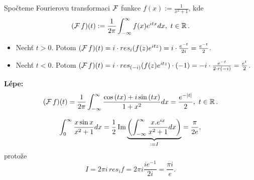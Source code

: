 \begin{example}
Spočteme Fourierovu transformaci $\operatorname{\mathcal{F}} $ funkce $f(x):=\frac{1}{x^2+1}$, kde
$$(\F f)(t):=\frac{1}{2\pi}\int_{-\infty}^\infty{f(x)e^{itx}}dx, \ t\in\Real. $$
\begin{itemize}
    \item Nechť $t>0$. Potom $(\operatorname{\mathcal{F}} f)(t)=i\cdot{res}_i{(f(z)e^{itz})}=i\cdot\frac{e^{-t}}{2i}=\frac{e^{-t}}{2}$.
    \item Nechť $t<0$. Potom $(\operatorname{\mathcal{F}} f)(t)=i\cdot{res}_{(-i)}{(f(z)e^{itz})}\cdot(-1)=-i\cdot\frac{e^{-t}}{2\cdot  r(-i)}=\frac{e^{t}}{2}$.
\end{itemize}
\textbf{Lépe:}
$$(\operatorname{\mathcal{F}} f)(t)=\frac{1}{2\pi}\int_{-\infty}^\infty\frac{\cos{(tx)}+i\sin{(tx)}}{1+x^2}dx=\frac{e^{-|t|}}{2}, \ t\in\operatorname{\mathbb{R}} .$$
\end{example}

\begin{example}
$$\int_0^\infty\frac{x\sin{x}}{x^2+1}dx=\frac{1}{2}\operatorname{Im} \underset{:=I}{\underbrace{\left(\int_{-\infty}^\infty\frac{x.e^{ix}}{x^2+1}dx\right)}}=\frac{\pi}{2e},$$
protože
$$I=2\pi i\,{res}_{i}{f}=2\pi i \frac{ie^{-1}}{2i}=\frac{\pi i}{e}.$$
\end{example}